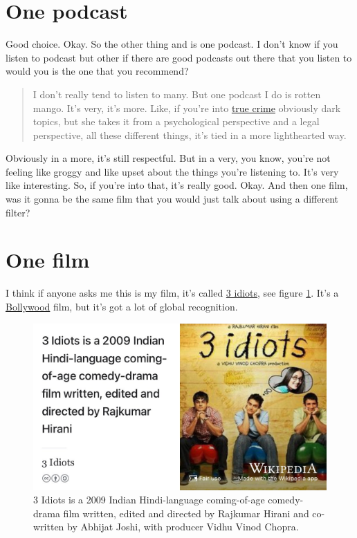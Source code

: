 \documentclass[
]{book}
\begin{document}
\hypertarget{one-podcast-1}{%
\section{One podcast}\label{one-podcast-1}}

Good choice. Okay. So the other thing and is one podcast. I don't know if you listen to podcast but other if there are good podcasts out there that you listen to would you is the one that you recommend?

\begin{quote}
I don't really tend to listen to many. But one podcast I do is rotten mango. \citep{rottenmango} It's very, it's more. Like, if you're into \href{https://en.wikipedia.org/wiki/True_crime}{true crime} obviously dark topics, but she takes it from a psychological perspective and a legal perspective, all these different things, it's tied in a more lighthearted way.
\end{quote}

Obviously in a more, it's still respectful. But in a very, you know, you're not feeling like groggy and like upset about the things you're listening to. It's very like interesting. So, if you're into that, it's really good. Okay. And then one film, was it gonna be the same film that you would just talk about using a different filter?

\hypertarget{one-film-1}{%
\section{One film}\label{one-film-1}}

I think if anyone asks me this is my film, it's called \href{https://en.wikipedia.org/wiki/3_Idiots}{3 idiots}, see figure \ref{fig:three-idiots-fig}. \citep{threeidiots} It's a \href{https://en.wikipedia.org/wiki/Bollywood}{Bollywood} film, but it's got a lot of global recognition.

\begin{figure}

{\centering \includegraphics[width=1\linewidth]{images/three-idiots} 

}

\caption{3 Idiots is a 2009 Indian Hindi-language coming-of-age comedy-drama film written, edited and directed by Rajkumar Hirani and co-written by Abhijat Joshi, with producer Vidhu Vinod Chopra. \citep{threeidiots}}\label{fig:three-idiots-fig}
\end{figure}
\end{document}
